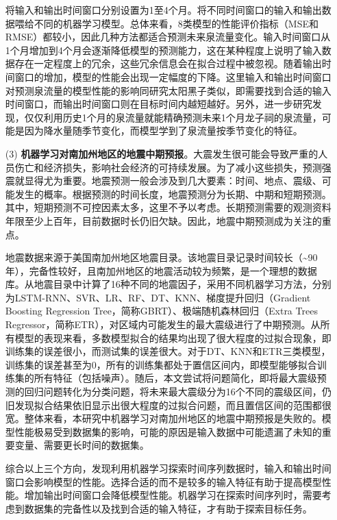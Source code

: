 \begin{enumerate}
  将输入和输出时间窗口分别设置为1至4个月。将不同时间窗口的输入和输出数据喂给不同的机器学习模型。总体来看，8类模型的性能评价指标（MSE和RMSE）都较小，因此几种方法都适合预测未来泉流量变化。输入时间窗口从1个月增加到4个月会逐渐降低模型的预测能力，这在某种程度上说明了输入数据存在一定程度上的冗余，这些冗余信息会在拟合过程中被忽视。随着输出时间窗口的增加，模型的性能会出现一定幅度的下降。这里输入和输出时间窗口对预测泉流量的模型性能的影响同研究太阳黑子类似，即需要找到合适的输入时间窗口，而输出时间窗口则在目标时间内越短越好。另外，进一步研究发现，仅仅利用历史1个月的泉流量就能精确预测未来1个月龙子祠的泉流量，可能是因为降水量随季节变化，而模型学到了泉流量按季节变化的特征。
  
  \item[(3)] \textbf{机器学习对南加州地区的地震中期预报}。大震发生很可能会导致严重的人员伤亡和经济损失，影响社会经济的可持续发展。为了减小这些损失，预测强震就显得尤为重要。地震预测一般会涉及到几大要素：时间、地点、震级、可能发生的概率。根据预测的时间长度，地震预测分为长期、中期和短期预测。其中，短期预测不可控因素太多，这里不予以考虑。长期预测需要的观测资料年限至少上百年，目前数据时长仍旧欠缺。因此，地震中期预测成为关注的重点。
  
  地震数据来源于美国南加州地区地震目录。该地震目录记录时间较长（\sim 90年），完备性较好，且南加州地区的地震活动较为频繁，是一个理想的数据库。从地震目录中计算了16种不同的地震因子，采用不同机器学习方法，分别为LSTM-RNN、SVR、LR、RF、DT、KNN、梯度提升回归（Gradient Boosting Regression Tree，简称GBRT）、极端随机森林回归（Extra Trees Regressor，简称ETR），对区域内可能发生的最大震级进行了中期预测。从所有模型的表现来看，多数模型拟合的结果均出现了很大程度的过拟合现象，即训练集的误差很小，而测试集的误差很大。对于DT、KNN和ETR三类模型，训练集的误差甚至为0，所有的训练集都处于置信区间内，即模型能够拟合训练集的所有特征（包括噪声）。随后，本文尝试将问题简化，即将最大震级预测的回归问题转化为分类问题，将未来最大震级分为16个不同的震级区间，仍旧发现拟合结果依旧显示出很大程度的过拟合问题，而且置信区间的范围都很宽。整体来看，本研究中机器学习对南加州地区的地震中期预报是失败的。模型性能极易受到数据集的影响，可能的原因是输入数据中可能遗漏了未知的重要变量、需要更长时间的数据集。

  综合以上三个方向，发现利用机器学习探索时间序列数据时，输入和输出时间窗口会影响模型的性能。选择合适的而不是较多的输入特征有助于提高模型性能。增加输出时间窗口会降低模型性能。机器学习在探索时间序列时，需要考虑到数据集的完备性以及找到合适的输入特征，才有助于探索目标任务。

\end{enumerate}


